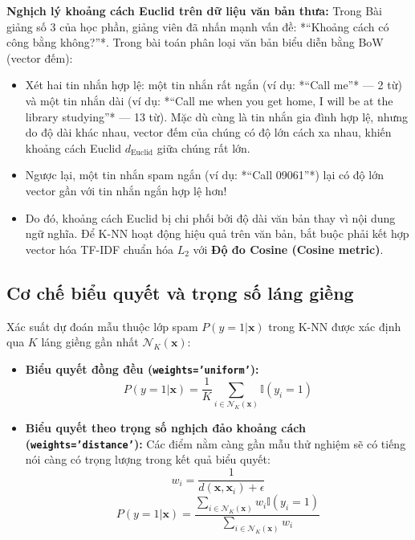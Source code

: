 \textbf{Nghịch lý khoảng cách Euclid trên dữ liệu văn bản thưa:}
Trong Bài giảng số 3 của học phần, giảng viên đã nhấn mạnh vấn đề: *“Khoảng cách có công bằng không?”*. Trong bài toán phân loại văn bản biểu diễn bằng BoW (vector đếm):
\begin{itemize}
    \item Xét hai tin nhắn hợp lệ: một tin nhắn rất ngắn (ví dụ: *“Call me”* --- 2 từ) và một tin nhắn dài (ví dụ: *“Call me when you get home, I will be at the library studying”* --- 13 từ). Mặc dù cùng là tin nhắn gia đình hợp lệ, nhưng do độ dài khác nhau, vector đếm của chúng có độ lớn cách xa nhau, khiến khoảng cách Euclid $d_{\text{Euclid}}$ giữa chúng rất lớn.
    \item Ngược lại, một tin nhắn spam ngắn (ví dụ: *“Call 09061”*) lại có độ lớn vector gần với tin nhắn ngắn hợp lệ hơn!
    \item Do đó, khoảng cách Euclid bị chi phối bởi độ dài văn bản thay vì nội dung ngữ nghĩa. Để K-NN hoạt động hiệu quả trên văn bản, bắt buộc phải kết hợp vector hóa TF-IDF chuẩn hóa $L_2$ với \textbf{Độ đo Cosine (Cosine metric)}.
\end{itemize}

\subsection{Cơ chế biểu quyết và trọng số láng giềng}
Xác suất dự đoán mẫu thuộc lớp spam $P(y=1 | \mathbf{x})$ trong K-NN được xác định qua $K$ láng giềng gần nhất $\mathcal{N}_K(\mathbf{x})$:
\begin{itemize}
    \item \textbf{Biểu quyết đồng đều (\texttt{weights='uniform'}):}
    \begin{equation}
    P(y=1 | \mathbf{x}) = \frac{1}{K} \sum_{i \in \mathcal{N}_K(\mathbf{x})} \mathbb{I}(y_i = 1)
    \end{equation}
    \item \textbf{Biểu quyết theo trọng số nghịch đảo khoảng cách (\texttt{weights='distance'}):}
    Các điểm nằm càng gần mẫu thử nghiệm sẽ có tiếng nói càng có trọng lượng trong kết quả biểu quyết:
    \begin{equation}
    w_i = \frac{1}{d(\mathbf{x}, \mathbf{x}_i) + \epsilon}
    \end{equation}
    \begin{equation}
    P(y=1 | \mathbf{x}) = \frac{\sum_{i \in \mathcal{N}_K(\mathbf{x})} w_i \mathbb{I}(y_i = 1)}{\sum_{i \in \mathcal{N}_K(\mathbf{x})} w_i}
    \end{equation}
\end{itemize}

